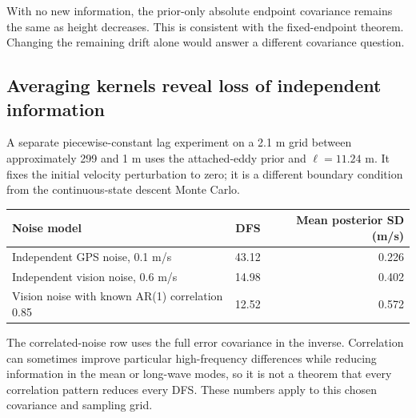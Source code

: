 \documentclass[11pt,a4paper]{article}
\numberwithin{equation}{section}
\begin{document}
\begin{center}
\end{center}
With no new information, the prior-only absolute endpoint covariance remains the same as height decreases. This is consistent with the fixed-endpoint theorem. Changing the remaining drift alone would answer a different covariance question.

\subsection{Averaging kernels reveal loss of independent information}
A separate piecewise-constant lag experiment on a 2.1 m grid between approximately 299 and 1 m uses the attached-eddy prior and $\ell=11.24$ m. It fixes the initial velocity perturbation to zero; it is a different boundary condition from the continuous-state descent Monte Carlo.
\begin{center}
\begin{tabular}{lrr}
\toprule
Noise model & DFS & Mean posterior SD (m/s)\\
\midrule
Independent GPS noise, 0.1 m/s & 43.12 & 0.226\\
Independent vision noise, 0.6 m/s & 14.98 & 0.402\\
Vision noise with known AR(1) correlation 0.85 & 12.52 & 0.572\\
\bottomrule
\end{tabular}
\end{center}
The correlated-noise row uses the full error covariance in the inverse. Correlation can sometimes improve particular high-frequency differences while reducing information in the mean or long-wave modes, so it is not a theorem that every correlation pattern reduces every DFS. These numbers apply to this chosen covariance and sampling grid.
\end{document}
